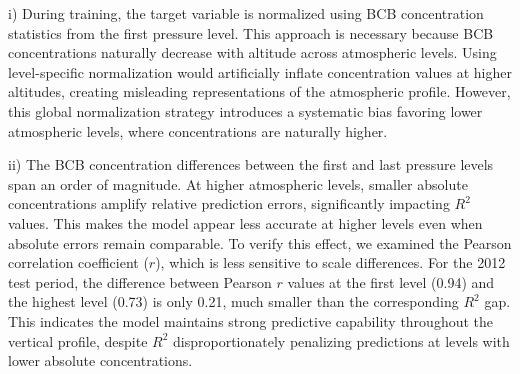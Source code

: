 \documentclass[11pt]{article}
\begin{document}
    i) During training, the target variable is normalized using BCB concentration statistics from the first pressure level. This approach is necessary because BCB concentrations naturally decrease with altitude across atmospheric levels. Using level-specific normalization would artificially inflate concentration values at higher altitudes, creating misleading representations of the atmospheric profile. However, this global normalization strategy introduces a systematic bias favoring lower atmospheric levels, where concentrations are naturally higher. %

    ii) The BCB concentration differences between the first and last pressure levels span an order of magnitude. At higher atmospheric levels, smaller absolute concentrations amplify relative prediction errors, significantly impacting $R^2$ values. This makes the model appear less accurate at higher levels even when absolute errors remain comparable. To verify this effect, we examined the Pearson correlation coefficient ($r$), which is less sensitive to scale differences. For the 2012 test period, the difference between Pearson $r$ values at the first level (0.94) and the highest level (0.73) is only 0.21, much smaller than the corresponding $R^2$ gap. This indicates the model maintains strong predictive capability throughout the vertical profile, despite $R^2$ disproportionately penalizing predictions at levels with lower absolute concentrations.
    
\end{document}
